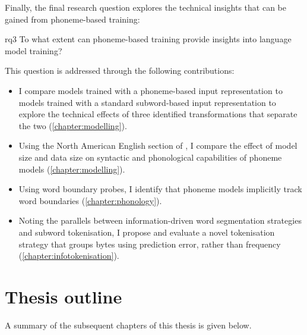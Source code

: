 Finally, the final research question explores the technical insights that can be gained from phoneme-based training:

\begin{question}{}{rq3}
    To what extent can phoneme-based training provide insights into language model training?
\end{question}

This question is addressed through the following contributions:

\begin{itemize}
    \item I compare models trained with a phoneme-based input representation to models trained with a standard subword-based input representation to explore the technical effects of three identified transformations that separate the two (\cref{chapter:modelling}).
    \item Using the North American English section of \ipachildes, I compare the effect of model size and data size on syntactic and phonological capabilities of phoneme models (\cref{chapter:modelling}).
    \item Using word boundary probes, I identify that phoneme models implicitly track word boundaries (\cref{chapter:phonology}).
    \item Noting the parallels between information-driven word segmentation strategies and subword tokenisation, I propose and evaluate a novel tokenisation strategy that groups bytes using prediction error, rather than frequency (\cref{chapter:infotokenisation}).
\end{itemize}

\section{Thesis outline}

A summary of the subsequent chapters of this thesis is given below.


